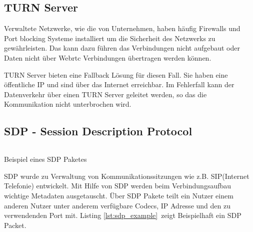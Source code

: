 %
%

\subsection{TURN Server}

Verwaltete Netzwerke, wie die von Unternehmen, haben häufig Firewalls und Port blocking Systeme installiert um die Sicherheit des Netzwerks zu gewährleisten. Das kann dazu führen das \webrtc Verbindungen nicht aufgebaut oder Daten nicht über Webrtc Verbindungen übertragen werden können.

TURN Server bieten eine Fallback Lösung für diesen Fall. Sie haben eine öffentliche IP und sind über das Internet erreichbar. Im Fehlerfall kann der Datenverkehr über einen TURN Server geleitet werden, so das die Kommunikation nicht unterbrochen wird.

\subsection{SDP - Session Description Protocol}
\begin{listing}[h]
	\inputminted{javascript}{listings/sdp_example.txt}
	\caption{Beispiel eines SDP Paketes}
	\label{lst:sdp_example}
\end{listing}
SDP\cite{sdp-standard} wurde zu Verwaltung von Kommunikationssitzungen wie z.B. SIP(Internet Telefonie) entwickelt. Mit Hilfe von SDP werden beim Verbindungsaufbau wichtige Metadaten ausgetauscht. Über SDP Pakete teilt ein Nutzer einem anderen Nutzer unter anderem verfügbare Codecs, IP Adresse und den zu verwendenden Port mit. Listing \ref{lst:sdp_example} zeigt Beispielhaft ein SDP Packet.



